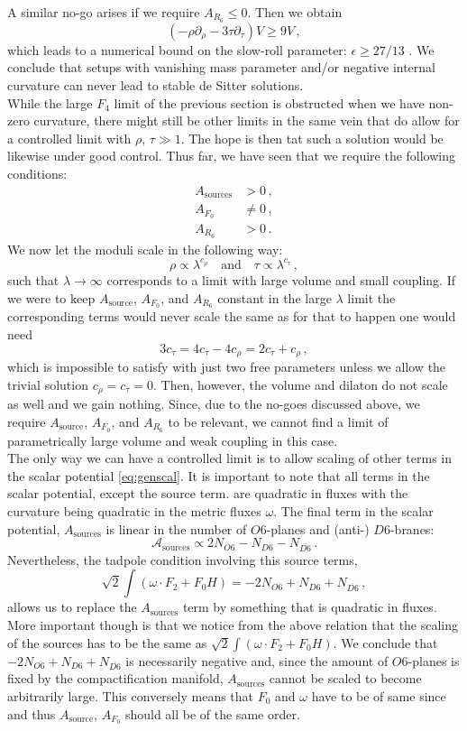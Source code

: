 \documentclass[12pt]{report}
\newcommand{\be}{\begin{equation}}
\newcommand{\ee}{\end{equation}}
\newcommand{\bea}{\begin{equation}\begin{aligned}}
\newcommand{\eea}{\end{aligned}\end{equation}}
\newcommand{\A}{\mathcal{A}}
\begin{document}
A similar no-go arises if we require $A_{R_6} \leq 0$. Then we obtain
\be
\left(-\rho \partial_\rho - 3 \tau \partial_\tau\right) V \geq 9V\,,
\ee
which leads to a numerical bound on the slow-roll parameter: $\epsilon \geq 27/13$ \cite{Hertzberg:2007wc}. We conclude that setups with vanishing mass parameter and/or negative internal curvature can never lead to stable de Sitter solutions.\\
While the large $F_4$ limit of the previous section is obstructed when we have non-zero curvature, there might still be other limits in the same vein that do allow for a controlled limit with $\rho,\,\tau \gg 1$. The hope is then tat such a solution would be likewise under good control. Thus far, we have seen that we require the following conditions:
\bea 
A_{\text{sources}} &> 0\,,\\
A_{F_0} &\neq 0\,,\\
A_{R_6} &>0\,.
\eea 
We now let the moduli scale in the following way:
\be 
\rho \propto \lambda^ {c_\rho} \quad \text{and} \quad \tau \propto \lambda^ {c_\tau}\,,
\ee
such that $\lambda \to \infty$ corresponds to a limit with large volume and small coupling. If we were to keep $A_{\text{source}}$, $A_{F_0}$, and $A_{R_6}$ constant in the large $\lambda$ limit the corresponding terms would never scale the same as for that to happen one would need
\be 
3 c_\tau = 4 c_\tau - 4 c_\rho = 2 c_\tau + c_\rho\,,
\ee
which is impossible to satisfy with just two free parameters unless we allow the trivial solution $c_\rho = c_\tau = 0$. Then, however, the volume and dilaton do not scale as well and we gain nothing. Since, due to the no-goes discussed above, we require $A_{\text{source}}$, $A_{F_0}$, and $A_{R_6}$ to be relevant, we cannot find a limit of parametrically large volume and weak coupling in this case.\\
The only way we can have a controlled limit is to allow scaling of other terms in the scalar potential \eqref{eq:genscal}. It is important to note that all terms in the scalar potential, except the source term. are quadratic in fluxes \cite{Herraez:2018vae} with the curvature being quadratic in the metric fluxes $\omega$. The final term in the scalar potential, $A_{\text{sources}}$ is linear in the number of $O6$-planes and (anti-) $D6$-branes:
\be 
\A_{\text{sources}} \propto 2 N_{O6} - N_{D6} - N_{\overline{D6}}\,.
\ee
Nevertheless, the tadpole condition involving this source terms,
\be 
\sqrt{2} \int \left( \omega \cdot F_2 + F_0 H\right) = -2 N_{O6} + N_{D6} + N_{\overline{D6}}\,,
\ee
allows us to replace the $A_{\text{sources}}$ term by something that is quadratic in fluxes. More important though is that we notice from the above relation that the scaling of the sources has to be the same as $\sqrt{2} \int \left( \omega \cdot F_2 + F_0 H\right)$. We conclude that $-2 N_{O6} + N_{D6} + N_{\overline{D6}}$ is necessarily negative and, since the amount of $O6$-planes is fixed by the compactification manifold, $A_{\text{sources}}$ cannot be scaled to become arbitrarily large. This conversely means that $F_0$ and $\omega$ have to be of same since and thus $A_{\text{source}}$, $A_{F_0}$ should all be of the same order.\\
\end{document}
